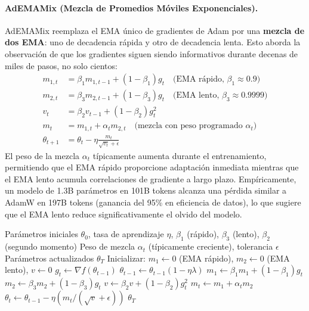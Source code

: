 \documentclass[11pt,a4paper]{article}
\begin{document}
\paragraph{AdEMAMix (Mezcla de Promedios Móviles Exponenciales).}
AdEMAMix reemplaza el EMA único de gradientes de Adam por una \textbf{mezcla de dos EMA}: uno de decadencia rápida y otro de decadencia lenta. Esto aborda la observación de que los gradientes siguen siendo informativos durante decenas de miles de pasos, no solo cientos:
\begin{align}
m_{1,t} &= \beta_1 m_{1,t-1} + (1-\beta_1)g_t \quad\text{(EMA rápido, $\beta_1 \approx 0.9$)} \\
m_{2,t} &= \beta_3 m_{2,t-1} + (1-\beta_3)g_t \quad\text{(EMA lento, $\beta_3 \approx 0.9999$)} \\
v_t &= \beta_2 v_{t-1} + (1-\beta_2)g_t^2 \\
m_t &= m_{1,t} + \alpha_t m_{2,t} \quad\text{(mezcla con peso programado $\alpha_t$)} \\
\theta_{t+1} &= \theta_t - \eta\frac{m_t}{\sqrt{v_t}+\epsilon}
\end{align}
El peso de la mezcla $\alpha_t$ típicamente aumenta durante el entrenamiento, permitiendo que el EMA rápido proporcione adaptación inmediata mientras que el EMA lento acumula correlaciones de gradiente a largo plazo. Empíricamente, un modelo de 1.3B parámetros en 101B tokens alcanza una pérdida similar a AdamW en 197B tokens (ganancia del 95\% en eficiencia de datos), lo que sugiere que el EMA lento reduce significativamente el olvido del modelo.

\begin{algorithm}[H]
\caption{AdEMAMix (Mezcla de Promedios Móviles Exponenciales)}
\label{alg:ademamix}
\begin{algorithmic}[1]
\Require Parámetros iniciales $\theta_0$, tasa de aprendizaje $\eta$, $\beta_1$ (rápido), $\beta_3$ (lento), $\beta_2$ (segundo momento)
\Require Peso de mezcla $\alpha_t$ (típicamente creciente), tolerancia $\epsilon$
\Ensure Parámetros actualizados $\theta_T$
\State Inicializar: $m_1 \gets 0$ (EMA rápido), $m_2 \gets 0$ (EMA lento), $v \gets 0$
    \State $g_t \gets \nabla f(\theta_{t-1})$
        \State $\theta_{t-1} \gets \theta_{t-1}(1 - \eta\lambda)$
    \EndIf
    \State $m_1 \gets \beta_1 m_1 + (1-\beta_1) g_t$ 
    \State $m_2 \gets \beta_3 m_2 + (1-\beta_3) g_t$ 
    \State $v \gets \beta_2 v + (1-\beta_2) g_t^2$
    \State $m_t \gets m_1 + \alpha_t m_2$ 
    \State $\theta_t \gets \theta_{t-1} - \eta (m_t / (\sqrt{v} + \epsilon))$
\EndFor
\Return $\theta_T$
\end{algorithmic}
\end{algorithm}
\end{document}
